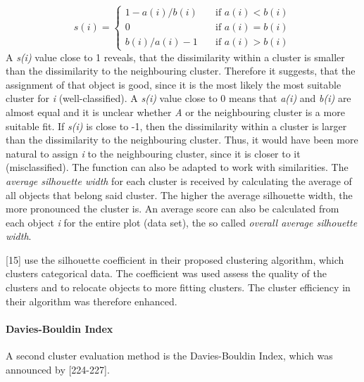   \[ s(i) =
  \begin{cases}
    1 - a(i)/b(i)       & \quad \text{if } a(i) < b(i)\\
    0       & \quad \text{if } a(i) = b(i)\\
 b(i)/a(i) - 1      & \quad \text{if } a(i) > b(i)

  \end{cases}
\]
A \textit{s(i)} value close to 1 reveals, that the dissimilarity within a cluster is smaller than the dissimilarity to the neighbouring cluster. Therefore it suggests, that the assignment of that object is good, since it is the most likely the most suitable cluster for \textit{i} (well-classified). A \textit{s(i)} value close to 0 means that \textit{a(i)} and \textit{b(i)} are almost equal and it is unclear whether \textit{A} or the neighbouring cluster is a more suitable fit. If \textit{s(i)} is close to -1, then the dissimilarity within a cluster is larger than the dissimilarity to the neighbouring cluster. Thus, it would have been more natural to assign \textit{i} to the neighbouring cluster, since it is closer to it (misclassified). The function can also be adapted to work with similarities.
The \textit{average silhouette width} for each cluster is received by calculating the average of all objects that belong said cluster. The higher the average silhouette width, the more pronounced the cluster is. An average score can also be calculated from each object \textit{i} for the entire plot (data set), the so called \textit{overall average silhouette width}. 

\textcite{silhouetteRelocatingMeasure}[15] use the silhouette coefficient in their proposed clustering algorithm, which clusters categorical data. The coefficient was used assess the quality of the clusters and to relocate objects to more fitting clusters. The cluster efficiency in their algorithm was therefore enhanced.




\paragraph{Davies-Bouldin Index}
A second cluster evaluation method is the Davies-Bouldin Index, which was announced by \textcite{DaviesBouldin}[224-227]. 

